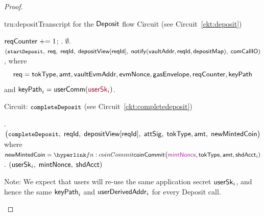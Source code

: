 \begin{proof}
\begin{itemize} [label=$\blacksquare$]
\begin{itemize}
\begin{TxtBox}{trn:deposit}{Transcript for the $\mathsf{Deposit}$ flow}
Circuit \upd{$\cktStartDeposit$} (see Circuit~\ref{ckt:deposit}) \begin{OutList}
\oitem{\Dvault} $\mathsf{reqCounter} \mathrel{+}= 1$; \; .
\oitem{\Dshd} $\emptyset$.
\oitem{\stmt} $(\texttt{\small startDeposit},\; \mathsf{req},\; \mathsf{reqId},\; \mathsf{depositView}[\mathsf{reqId}],\;
  \mathsf{notify}(\mathsf{vaultAddr}, \mathsf{reqId}, \mathsf{depositMap}),\; \mathsf{comCallIO})$, where
  $$\mathsf{req} = \mathsf{tokType}, \mathsf{amt}, \mathsf{vaultEvmAddr}, \mathsf{evmNonce}, \mathsf{gasEnvelope}, \mathsf{reqCounter}, \mathsf{keyPath}$$
  and
  $\keyPath_i= \userComm(\secret{\usersk_i})$.
   \oitem{\zkproofs} \bluedot
\oitem{\Rel}  
\end{OutList}
Circuit: $\texttt{\small completeDeposit}$ (see Circuit~\ref{ckt:completedeposit})
\begin{OutList}
\oitem{\Dvault} .
  \oitem{\Dshd} \bluedot
\oitem{\stmt} $\bigl(\texttt{\small completeDeposit},\; \mathsf{reqId},\; \mathsf{depositView}[\mathsf{reqId}],\; \mathsf{attSig},\;
  \mathsf{tokType}, \mathsf{amt},\; \mathsf{newMintedCoin}\bigr)$  where
  $\coinClaim=\lnk{fn:coinCommit}\coinCommit \bigl(\freshrn{\mintNonce}, \tokType,\amt,\shdAcct_i)$.
  \oitem{\zkproofs} \bluedot
  \oitem{\wit} $(\mathsf{userSk}_i,\; \mathsf{mintNonce},\; \mathsf{shdAcct})$
\end{OutList}
\end{TxtBox}

\begin{ProcBox}
    { Note:} We expect that users will re-use  the same  application secret $\mathsf{userSk}_i$, and hence the same $\mathsf{keyPath}_i$  and $\mathsf{userDerivedAddr}_i$ for every Deposit call.
\end{ProcBox}



\end{itemize}
\end{itemize}
\end{proof}
